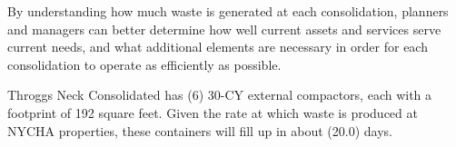 
    By understanding how much waste is generated at each consolidation, planners and managers
    can better determine how well current assets and services serve current needs, and what additional 
    elements are necessary in order for each consolidation to operate as efficiently as possible. 

    Throggs Neck Consolidated has (6) 30-CY external compactors, each with a footprint of 192 square feet. Given the rate at which waste is produced at NYCHA properties, these containers will fill
    up in about (20.0) days.